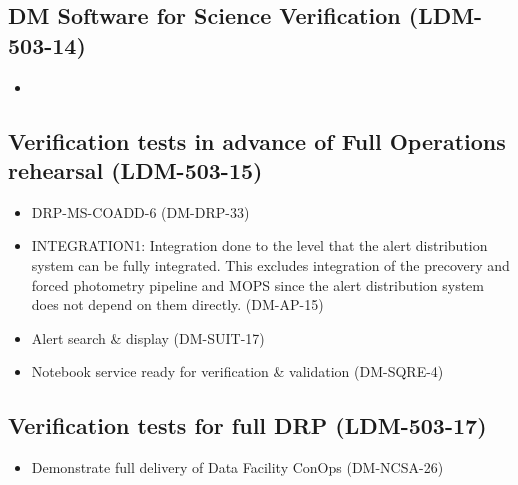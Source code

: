 \subsection{DM Software for Science Verification \textbf{(LDM-503-14)}\label{LDM-503-14}}
\begin{itemize}
\item
\end{itemize}
\subsection{Verification tests in advance of Full Operations rehearsal  \textbf{(LDM-503-15)}\label{LDM-503-15}}
\begin{itemize}
\item DRP-MS-COADD-6		(DM-DRP-33)

\item INTEGRATION1:  Integration done to the level that the alert distribution system can be fully integrated.  This excludes integration of the precovery and forced photometry pipeline and MOPS since the alert distribution system does not depend on them directly.		(DM-AP-15)
\item Alert search \& display		(DM-SUIT-17)
\item Notebook service ready for verification \& validation		(DM-SQRE-4)
\end{itemize}

\subsection{Verification tests for full DRP \textbf{(LDM-503-17)}\label{LDM-503-17}}

\begin{itemize}
\item Demonstrate full delivery of Data Facility ConOps		(DM-NCSA-26)
\end{itemize}
